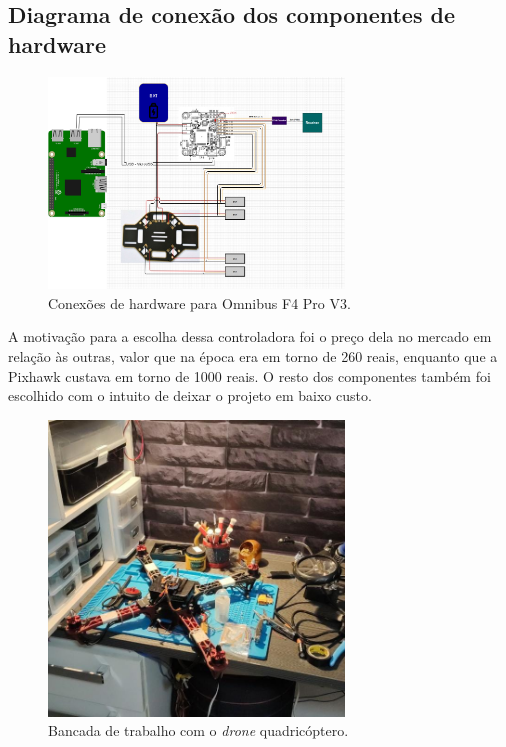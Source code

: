 \documentclass[12pt,a4paper,oneside]{book}
\begin{document}
\subsection{Diagrama de conexão dos componentes de hardware}
%
\begin{figure}[!htbp]
  \centering
  \includegraphics[width=0.7\textwidth]{Images/Diagramas/hardware_connections.png}
  \caption{Conexões de hardware para Omnibus F4 Pro V3.}
  \label{fig:hardware_connections.png.0}
\end{figure}
%
A motivação para a escolha dessa controladora foi o preço dela no mercado em relação às outras, valor que na época era em torno de 260 reais, enquanto que a Pixhawk custava em torno de 1000 reais. O resto dos componentes também foi escolhido com o intuito de deixar o projeto em baixo custo. 
%
\begin{figure}[!htbp]
  \centering
  \includegraphics[width=0.7\textwidth]{Images/Desenvolvimento/omnibus_drone.jpeg}
  \caption{Bancada de trabalho com o \textit{drone} quadricóptero.}
  \label{fig:omnibus_drone.jpeg.0}
\end{figure}
%
\end{document}
